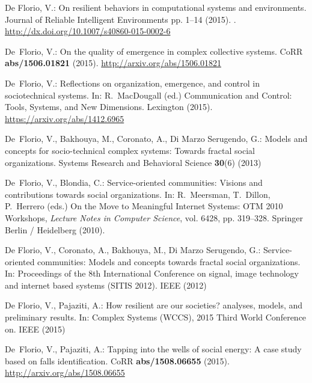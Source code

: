 \documentclass[twocolumn]{svjour3}
\begin{document}
\begin{thebibliography}{10}
{De Florio}, V.: On resilient behaviors in computational systems and
  environments.
\newblock Journal of Reliable Intelligent Environments pp. 1--14 (2015).
\newblock {}.
\newblock \urlprefix\url{http://dx.doi.org/10.1007/s40860-015-0002-6}

{De~Florio}, V.: On the quality of emergence in complex collective systems.
\newblock CoRR \textbf{abs/1506.01821} (2015).
\newblock \urlprefix\url{http://arxiv.org/abs/1506.01821}

{De~Florio}, V.: Reflections on organization, emergence, and control in
  sociotechnical systems.
\newblock In: R.~MacDougall (ed.) Communication and Control: Tools, Systems,
  and New Dimensions. Lexington (2015).
\newblock \urlprefix\url{https://arxiv.org/abs/1412.6965}

{De~Florio}, V., Bakhouya, M., Coronato, A., {Di Marzo Serugendo}, G.: Models
  and concepts for socio-technical complex systems: Towards fractal social
  organizations.
\newblock Systems Research and Behavioral Science \textbf{30}(6) (2013)

De~Florio, V., Blondia, C.: Service-oriented communities: Visions and
  contributions towards social organizations.
\newblock In: R.~Meersman, T.~Dillon, P.~Herrero (eds.) On the Move to
  Meaningful Internet Systems: OTM 2010 Workshops, \emph{Lecture Notes in
  Computer Science}, vol. 6428, pp. 319--328. Springer Berlin / Heidelberg
  (2010).
\newblock {}

{De Florio}, V., Coronato, A., Bakhouya, M., {Di Marzo Serugendo}, G.:
  Service-oriented communities: Models and concepts towards fractal social
  organizations.
\newblock In: Proceedings of the 8th International Conference on signal, image
  technology and internet based systems (SITIS 2012). IEEE (2012)

{De Florio}, V., Pajaziti, A.: How resilient are our societies? analyses,
  models, and preliminary results.
\newblock In: Complex Systems (WCCS), 2015 Third World Conference on. IEEE
  (2015)

{De~Florio}, V., Pajaziti, A.: Tapping into the wells of social energy: {A}
  case study based on falls identification.
\newblock CoRR \textbf{abs/1508.06655} (2015).
\newblock \urlprefix\url{http://arxiv.org/abs/1508.06655}


\end{thebibliography}
\end{document}
